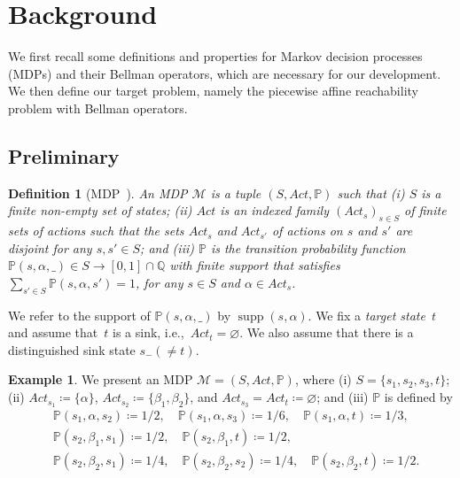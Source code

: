 \documentclass[preprint,12pt]{elsarticle}
\theoremstyle{plain}
\newtheorem{definition}[theorem]{Definition}
\theoremstyle{definition}
\newtheorem{example}[theorem]{Example}
\theoremstyle{remark}
\theoremstyle{claimstyle}
\newcommand{\mdp}{\mathcal{M}}
\newcommand{\prob}{\mathbb{P}}
\newcommand{\QQ}{\mathbb{Q}}
\DeclareMathOperator*{\supp}{supp}
\begin{document}
\section{Background}\label{sec:prelim}


We first recall some definitions and properties for Markov decision processes (MDPs) and their Bellman operators, which are necessary for our development. 
We then define our target problem, namely the piecewise affine reachability problem with Bellman operators. 

\subsection{Preliminary}
\begin{definition}[MDP~\cite{Puterman94}]
	An MDP $\mdp$ is a tuple $(S, Act, \prob)$ such that (i) $S$ is a finite non-empty set of \emph{states}; 
	(ii) $Act$ is an indexed family $(Act_s)_{s\in S}$ of finite sets of \emph{actions} such that the sets $Act_s$ and $Act_{s'}$ of actions on $s$ and $s'$ are disjoint for any $s, s'\in S$; and (iii) $\prob$ is the transition probability function~$\prob(s, \alpha, \_) \in S\rightarrow [0, 1]\cap \QQ$ with finite support that satisfies $\sum_{s'\in S} \prob(s, \alpha, s') = 1$, for any $s\in S$ and $\alpha \in Act_s$. 
\end{definition}

We refer to the support of $\prob(s, \alpha, \_)$ by $\supp(s, \alpha)$.
We fix a \emph{target state}~$t$ and assume that~$t$ is a sink, i.e.,~$Act_t = \varnothing$.
We also assume that there is a distinguished sink state $s_{-} (\not = t)$.
\begin{example}
	\label{ex:mdp}
	We present an MDP $\mdp = (S, Act, \prob)$, where (i) $S = \{s_1, s_2, s_3,t\}$; (ii) $Act_{s_1} \coloneqq \{\alpha\}$, $Act_{s_2} \coloneqq \{\beta_1, \beta_2\}$, and $Act_{s_3} = Act_{t} \coloneqq \varnothing$; and (iii) $\prob$ is defined by 
	\begin{align*}
		&\prob(s_1, \alpha, s_2) \coloneqq 1/2,\quad \prob(s_1, \alpha, s_3) \coloneqq 1/6,\quad \prob(s_1, \alpha, t) \coloneqq 1/3,\\
		&\prob(s_2, \beta_1, s_1)\coloneqq 1/2, \quad \prob(s_2, \beta_1, t) \coloneqq 1/2, \\
		&\prob(s_2, \beta_2, s_1)\coloneqq 1/4, \quad \prob(s_2, \beta_2, s_2) \coloneqq 1/4, \quad \prob(s_2, \beta_2, t) \coloneqq 1/2. 
	\end{align*}
\end{example}
\end{document}
